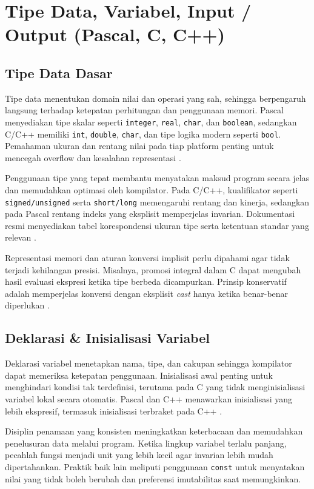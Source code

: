 \documentclass[../main.tex]{subfiles}
\begin{document}
\chapter{Tipe Data, Variabel, Input / Output (Pascal, C, C++)}
\section{Tipe Data Dasar}
Tipe data menentukan domain nilai dan operasi yang sah, sehingga berpengaruh langsung terhadap ketepatan perhitungan dan penggunaan memori. Pascal menyediakan tipe skalar seperti \texttt{integer}, \texttt{real}, \texttt{char}, dan \texttt{boolean}, sedangkan C/C++ memiliki \texttt{int}, \texttt{double}, \texttt{char}, dan tipe logika modern seperti \texttt{bool}. Pemahaman ukuran dan rentang nilai pada tiap platform penting untuk mencegah overflow dan kesalahan representasi \parencite{pascal-tutorial-wikibooks,iso-c-draft-n1570,cpp-reference}.

Penggunaan tipe yang tepat membantu menyatakan maksud program secara jelas dan memudahkan optimasi oleh kompilator. Pada C/C++, kualifikator seperti \texttt{signed/unsigned} serta \texttt{short/long} memengaruhi rentang dan kinerja, sedangkan pada Pascal rentang indeks yang eksplisit memperjelas invarian. Dokumentasi resmi menyediakan tabel korespondensi ukuran tipe serta ketentuan standar yang relevan \parencite{free-pascal-docs,iso-c-draft-n1570,cpp-reference}.

Representasi memori dan aturan konversi implisit perlu dipahami agar tidak terjadi kehilangan presisi. Misalnya, promosi integral dalam C dapat mengubah hasil evaluasi ekspresi ketika tipe berbeda dicampurkan. Prinsip konservatif adalah memperjelas konversi dengan eksplisit \emph{cast} hanya ketika benar-benar diperlukan \parencite{gnu-c-manual,cpp-reference}.

\section{Deklarasi \& Inisialisasi Variabel}
Deklarasi variabel menetapkan nama, tipe, dan cakupan sehingga kompilator dapat memeriksa ketepatan penggunaan. Inisialisasi awal penting untuk menghindari kondisi tak terdefinisi, terutama pada C yang tidak menginisialisasi variabel lokal secara otomatis. Pascal dan C++ menawarkan inisialisasi yang lebih ekspresif, termasuk inisialisasi terbraket pada C++ \parencite{pascal-tutorial-wikibooks,gnu-c-manual,cpp-reference}.

Disiplin penamaan yang konsisten meningkatkan keterbacaan dan memudahkan penelusuran data melalui program. Ketika lingkup variabel terlalu panjang, pecahlah fungsi menjadi unit yang lebih kecil agar invarian lebih mudah dipertahankan. Praktik baik lain meliputi penggunaan \texttt{const} untuk menyatakan nilai yang tidak boleh berubah dan preferensi imutabilitas saat memungkinkan.
\end{document}
